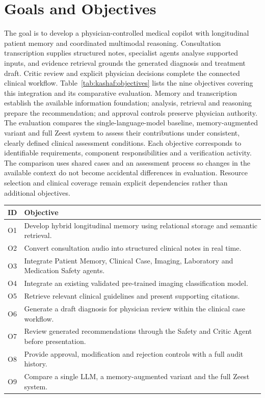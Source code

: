 \section{Goals and Objectives}

The goal is to develop a physician-controlled medical copilot with longitudinal patient memory and coordinated multimodal reasoning. Consultation transcription supplies structured notes, specialist agents analyse supported inputs, and evidence retrieval grounds the generated diagnosis and treatment draft. Critic review and explicit physician decisions complete the connected clinical workflow. Table~\ref{tab:kashaf:objectives} lists the nine objectives covering this integration and its comparative evaluation. Memory and transcription establish the available information foundation; analysis, retrieval and reasoning prepare the recommendation; and approval controls preserve physician authority. The evaluation compares the single-language-model baseline, memory-augmented variant and full Zeest system to assess their contributions under consistent, clearly defined clinical assessment conditions. Each objective corresponds to identifiable requirements, component responsibilities and a verification activity. The comparison uses shared cases and an assessment process so changes in the available context do not become accidental differences in evaluation. Resource selection and clinical coverage remain explicit dependencies rather than additional objectives.

\begin{reporttable}
\centering
\small
\caption{Zeest objectives covering memory, clinical processing, physician review and comparative evaluation.}
\label{tab:kashaf:objectives}
\begin{tabular}{|p{}|p{}|}
\hline
ID & Objective \\ \hline
O1 & Develop hybrid longitudinal memory using relational storage and semantic retrieval. \\ \hline
O2 & Convert consultation audio into structured clinical notes in real time. \\ \hline
O3 & Integrate Patient Memory, Clinical Case, Imaging, Laboratory and Medication Safety agents. \\ \hline
O4 & Integrate an existing validated pre-trained imaging classification model. \\ \hline
O5 & Retrieve relevant clinical guidelines and present supporting citations. \\ \hline
O6 & Generate a draft diagnosis for physician review within the clinical case workflow. \\ \hline
O7 & Review generated recommendations through the Safety and Critic Agent before presentation. \\ \hline
O8 & Provide approval, modification and rejection controls with a full audit history. \\ \hline
O9 & Compare a single LLM, a memory-augmented variant and the full Zeest system. \\ \hline
\end{tabular}
\end{reporttable}

